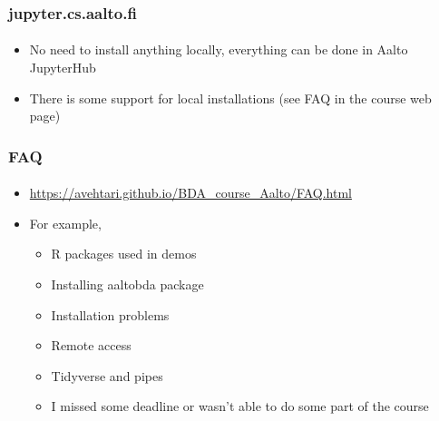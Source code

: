 \documentclass[english,t]{beamer}
\begin{document}
\begin{frame}

  \frametitle{jupyter.cs.aalto.fi}  %
  \framesubtitle{}

  \begin{itemize}
  \item No need to install anything locally, everything can be done in
    Aalto JupyterHub
  \item There is some support for local installations (see FAQ in the
    course web page)
  \end{itemize}
  
\end{frame}  

\begin{frame}

  \frametitle{FAQ}  %
  \framesubtitle{}

  \begin{itemize}
  \item {\small\url{https://avehtari.github.io/BDA_course_Aalto/FAQ.html}}
  \item For example,
    \begin{itemize}
    \item R packages used in demos
    \item Installing aaltobda package
    \item Installation problems
    \item Remote access
    \item Tidyverse and pipes
    \item I missed some deadline or wasn’t able to do some part of the course
    \end{itemize}
  \end{itemize}
  
\end{frame}  
\end{document}

